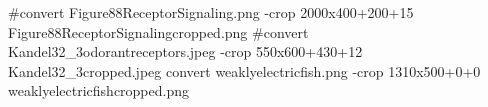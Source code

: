 #convert Figure88ReceptorSignaling.png -crop 2000x400+200+15 Figure88ReceptorSignalingcropped.png
#convert Kandel32_3odorantreceptors.jpeg -crop 550x600+430+12 Kandel32_3cropped.jpeg
convert weaklyelectricfish.png -crop 1310x500+0+0 weaklyelectricfishcropped.png
